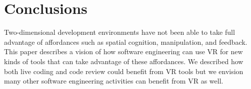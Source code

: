 \documentclass[conference]{IEEEtran}
\begin{document}
\section{Conclusions}

Two-dimensional development environments have not been able to take full advantage of affordances such as spatial cognition, manipulation, and feedback.
This paper describes a vision of how software engineering can use VR for new kinds of tools that can take advantage of these affordances.
We described how both live coding and code review could benefit from VR tools but we envision many other software engineering activities can benefit from VR as well.





\end{document}
